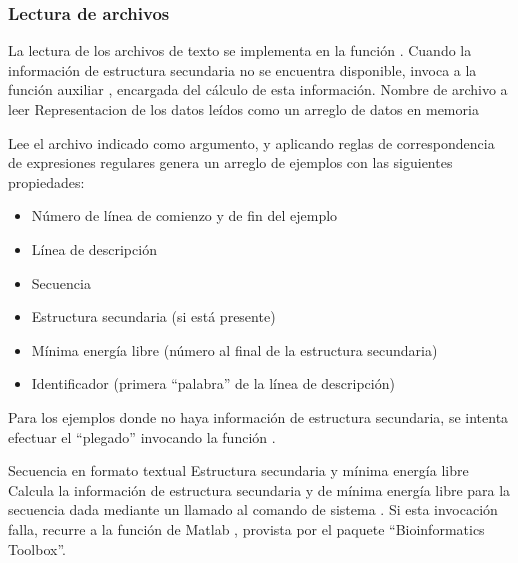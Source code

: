 %
\subsubsection{Lectura de archivos}
%
La lectura de los archivos de texto se implementa en la función
.
Cuando la información de estructura secundaria no se encuentra
disponible,  invoca a la función auxiliar
, encargada del cálculo de esta información.
%
          {Nombre de archivo a leer}
          {Representacion de los datos leídos como un
            arreglo de datos en memoria}
          {Lee el archivo indicado como argumento, y aplicando reglas
            de correspondencia de expresiones regulares genera un
            arreglo de ejemplos con las siguientes propiedades:
            \begin{itemize}
            \item Número de línea de comienzo y de fin del ejemplo
            \item Línea de descripción
            \item Secuencia
            \item Estructura secundaria (si está presente)
            \item Mínima energía libre (número al final de la
              estructura secundaria)
            \item Identificador (primera ``palabra'' de la línea de
              descripción)
            \end{itemize}
            Para los ejemplos donde no haya información de
            estructura secundaria, se intenta efectuar el ``plegado''
            invocando la función .
          }
%
          {Secuencia en formato textual}
          {Estructura secundaria y mínima energía libre}
          {Calcula la información de estructura secundaria y de mínima
            energía libre para la secuencia dada mediante un llamado
            al comando de sistema . Si esta invocación
            falla, recurre a la función de Matlab ,
            provista por el paquete ``Bioinformatics Toolbox''.}
%
